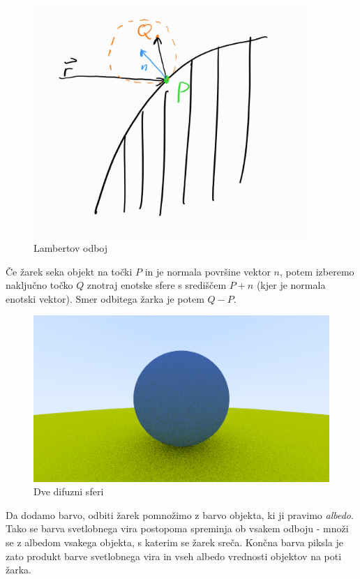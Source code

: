 \documentclass[12pt, a4paper]{article}
\begin{document}
\begin{figure}[H]
	\centering
	\includegraphics[height=250pt]{shema_difzuni}
	\caption{Lambertov odboj}
\end{figure}

Če žarek seka objekt na točki $P$ in je normala površine vektor $n$, potem izberemo naključno točko $Q$
znotraj enotske sfere s središčem $P + n$ (kjer je normala enotski vektor). Smer odbitega žarka je potem
$Q - P$.

\begin{figure}[H]
	\centering
	\includegraphics[width=400pt]{difuzni}
	\caption{Dve difuzni sferi}
\end{figure}

Da dodamo barvo, odbiti žarek pomnožimo z barvo objekta, ki ji pravimo \textit{albedo}. Tako se barva
svetlobnega vira postopoma spreminja ob vsakem odboju - množi se z albedom vsakega objekta, s katerim se
žarek sreča. Končna barva piksla je zato produkt barve svetlobnega vira in vseh albedo vrednosti
objektov na poti žarka.
\end{document}
